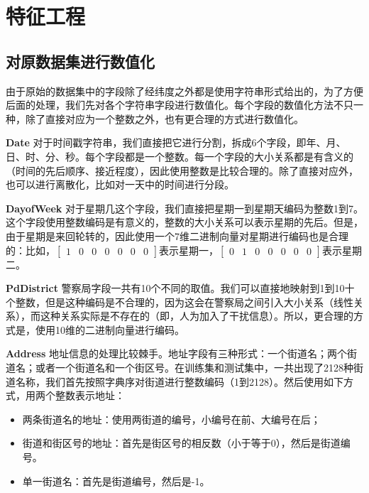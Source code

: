 \section{特征工程}
\label{sec:feature}

\subsection{对原数据集进行数值化}

由于原始的数据集中的字段除了经纬度之外都是使用字符串形式给出的，为了方便后面的处理，我们先对各个字符串字段进行数值化。每个字段的数值化方法不只一种，除了直接对应为一个整数之外，也有更合理的方式进行数值化。

\textbf{Date} 对于时间戳字符串，我们直接把它进行分割，拆成6个字段，即年、月、日、时、分、秒。每个字段都是一个整数。每一个字段的大小关系都是有含义的（时间的先后顺序、接近程度），因此使用整数是比较合理的。除了直接对应外，也可以进行离散化，比如对一天中的时间进行分段。

\textbf{DayofWeek} 对于星期几这个字段，我们直接把星期一到星期天编码为整数1到7。这个字段使用整数编码是有意义的，整数的大小关系可以表示星期的先后。但是，由于星期是来回轮转的，因此使用一个7维二进制向量对星期进行编码也是合理的：比如，$[\begin{array}{ccccccc}1&0&0&0&0&0&0\end{array}]$表示星期一，$[\begin{array}{ccccccc}0&1&0&0&0&0&0\end{array}]$表示星期二。

\textbf{PdDistrict} 警察局字段一共有10个不同的取值。我们可以直接地映射到1到10十个整数，但是这种编码是不合理的，因为这会在警察局之间引入大小关系（线性关系），而这种关系实际是不存在的（即，人为加入了干扰信息）。所以，更合理的方式是，使用10维的二进制向量进行编码。

\textbf{Address} 地址信息的处理比较棘手。地址字段有三种形式：一个街道名；两个街道名；或者一个街道名和一个街区号。在训练集和测试集中，一共出现了2128种街道名称，我们首先按照字典序对街道进行整数编码（1到2128）。然后使用如下方式，用两个整数表示地址：

\begin{itemize}
    \item 两条街道名的地址：使用两街道的编号，小编号在前、大编号在后；
    \item 街道和街区号的地址：首先是街区号的相反数（小于等于0），然后是街道编号。
    \item 单一街道名：首先是街道编号，然后是-1。
\end{itemize}

